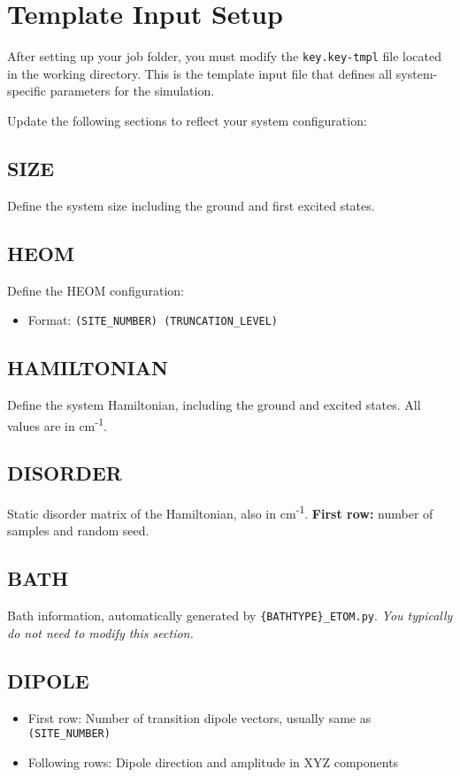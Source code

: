 \documentclass{article}
\begin{document}
\newpage

\section{Template Input Setup}

After setting up your job folder, you must modify the \texttt{key.key-tmpl} file located in the working directory. This is the template input file that defines all system-specific parameters for the simulation.

Update the following sections to reflect your system configuration:

\subsection*{SIZE}
Define the system size including the ground and first excited states.

\subsection*{HEOM}
Define the HEOM configuration:
\begin{itemize}
    \item Format: \texttt{(SITE\_NUMBER) (TRUNCATION\_LEVEL)}
\end{itemize}

\subsection*{HAMILTONIAN}
Define the system Hamiltonian, including the ground and excited states. All values are in cm\textsuperscript{-1}.

\subsection*{DISORDER}
Static disorder matrix of the Hamiltonian, also in cm\textsuperscript{-1}.  
\textbf{First row:} number of samples and random seed.

\subsection*{BATH}
Bath information, automatically generated by \texttt{\{BATHTYPE\}\_ETOM.py}.  
\textit{You typically do not need to modify this section.}

\subsection*{DIPOLE}
\begin{itemize}
    \item First row: Number of transition dipole vectors, usually same as \texttt{(SITE\_NUMBER)}
    \item Following rows: Dipole direction and amplitude in XYZ components
\end{itemize}
\end{document}
